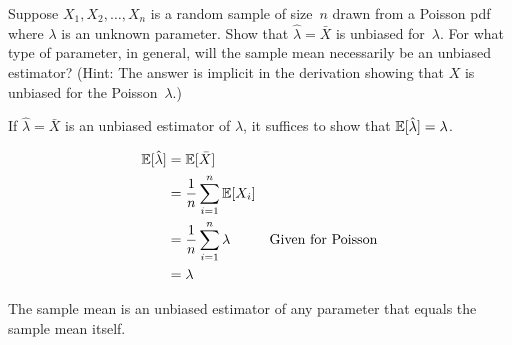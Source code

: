 \begin{problem}
   Suppose $X_1,X_2,\ldots,X_n$ is a random sample of size~$n$ drawn from a Poisson pdf where $\lambda$ is an unknown parameter. Show that ${\hat{\lambda} = \bar{X}}$ is unbiased for~$\lambda$. For what type of parameter, in general, will the sample mean necessarily be an unbiased estimator? (Hint: The answer is implicit in the derivation showing that $X$ is unbiased for the Poisson~$\lambda$.)
\end{problem}

If ${\hat{\lambda} = \bar{X}}$ is an unbiased estimator of $\lambda$, it suffices to show that ${\mathbb{E}\lbrack\hat{\lambda}\rbrack = \lambda}$.

\begin{align}
  \mathbb{E}\lbrack\hat{\lambda}\rbrack &= \mathbb{E}\lbrack\bar{X}\rbrack \\
                         &= \frac{1}{n} \sum_{i=1}^{n} \mathbb{E}\lbrack X_i\rbrack \\
                         &= \frac{1}{n} \sum_{i=1}^{n} \lambda & \text{Given for Poisson} \\
                         &= \lambda
\end{align}

The sample mean is an unbiased estimator of any parameter that equals the sample mean itself.
